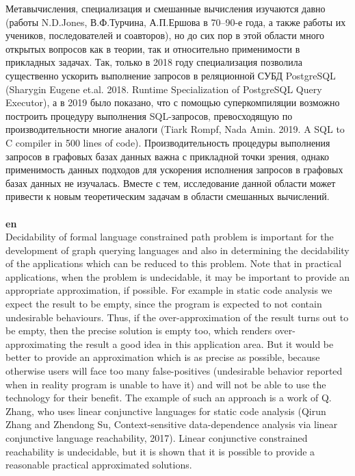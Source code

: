 \documentclass[12pt]{article}  %
\theoremstyle{remark}
\begin{document}
Метавычисления, специализация и смешанные вычисления изучаются давно (работы N.D.Jones, В.Ф.Турчина, А.П.Ершова в 70--90-е года, а также работы их учеников, последователей и соавторов), но до сих пор в этой области много открытых вопросов как в теории, так и относительно применимости в прикладных задачах. Так, только в 2018 году специализация позволила существенно ускорить выполнение запросов в реляционной СУБД PostgreSQL (Sharygin Eugene et.al. 2018. Runtime Specialization of PostgreSQL Query Executor), а в 2019 было показано, что с помощью суперкомпиляции возможно построить процедуру выполнения SQL-запросов, превосходящую по производительности многие аналоги (Tiark Rompf, Nada Amin. 2019. A SQL to C compiler in 500 lines of code). Производительность процедуры выполнения запросов в графовых базах данных важна с прикладной точки зрения, однако применимость данных подходов для ускорения исполнения запросов в графовых базах данных не изучалась. Вместе с тем, исследование данной области может привести к новым теоретическим задачам в области смешанных вычислений.
\\
\\
\textbf{en}\\
Decidability of formal language constrained path problem is important for the development of graph querying languages and also in determining the decidability of the applications which can be reduced to this problem. Note that in practical applications, when the problem is undecidable, it may be important to provide an appropriate approximation, if possible. For example in static code analysis we expect the result to be empty, since the program is expected to not contain undesirable behaviours. Thus, if the over-approximation of the result turns out to be empty, then the precise solution is empty too, which renders over-approximating the result a good idea in this application area. But it would be better to provide an approximation which is as precise as possible, because otherwise users will face too many false-positives (undesirable behavior reported when in reality program is unable to have it) and will not be able to use the technology for their benefit. The example of such an approach is a work of Q. Zhang, who uses linear conjunctive languages for static code analysis (Qirun Zhang and Zhendong Su, Context-sensitive data-dependence analysis via linear conjunctive language reachability, 2017). Linear conjunctive constrained reachability is undecidable, but it is shown that it is possible to provide a reasonable practical approximated solutions.
\end{document}

